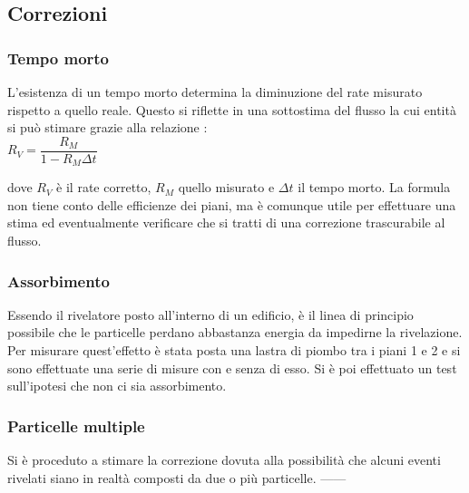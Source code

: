 \documentclass[11pt]{article}
\begin{document}
\subsection{Correzioni}
\subsubsection{Tempo morto}
L'esistenza di un tempo morto determina la diminuzione del rate misurato rispetto a quello reale. Questo si riflette in una sottostima del flusso la cui entità si può stimare grazie alla relazione \cite{correzione_tempomorto}: \\
$
R_V = \dfrac{R_M}{1-R_M \Delta t}
$

dove $R_V$ è il rate corretto, $R_M$ quello misurato e $\Delta t$ il tempo morto. La formula non tiene conto delle efficienze dei piani, ma è comunque utile per effettuare una stima ed eventualmente verificare che si tratti di una correzione trascurabile al flusso.

\subsubsection{Assorbimento}
Essendo il rivelatore posto all'interno di un edificio, è il linea di principio possibile che le particelle perdano abbastanza energia da impedirne la rivelazione. Per misurare quest'effetto è stata posta una lastra di piombo tra i piani 1 e 2 e si sono effettuate una serie di misure con e senza di esso. Si è poi effettuato un test sull'ipotesi che non ci sia assorbimento.

\subsubsection{Particelle multiple}
Si è proceduto a stimare la correzione dovuta alla possibilità che alcuni eventi rivelati siano in realtà composti da due o più particelle. 
------
\end{document}
